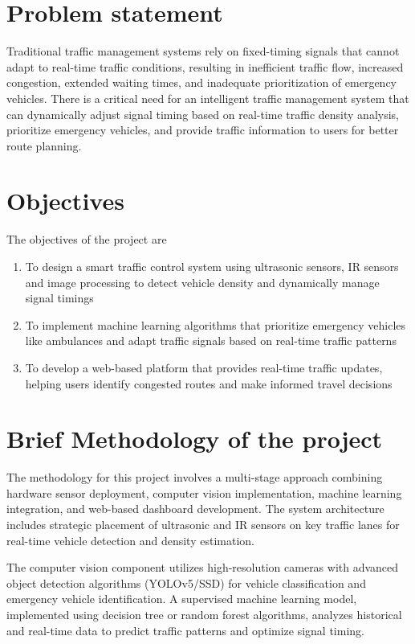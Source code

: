 \documentclass[12pt]{report}
\begin{document}
\section[Problem statement]{\textbf{Problem statement}}

Traditional traffic management systems rely on fixed-timing signals that cannot adapt to real-time traffic conditions, resulting in inefficient traffic flow, increased congestion, extended waiting times, and inadequate prioritization of emergency vehicles. There is a critical need for an intelligent traffic management system that can dynamically adjust signal timing based on real-time traffic density analysis, prioritize emergency vehicles, and provide traffic information to users for better route planning.

\section[Objectives]{\textbf{Objectives}}
The objectives of the project are
\begin{enumerate}
\item To design a smart traffic control system using ultrasonic sensors, IR sensors and image processing to detect vehicle density and dynamically manage signal timings
\item To implement machine learning algorithms that prioritize emergency vehicles like ambulances and adapt traffic signals based on real-time traffic patterns
\item To develop a web-based platform that provides real-time traffic updates, helping users identify congested routes and make informed travel decisions
\end{enumerate}

\section[Brief Methodology of the project]{\textbf{Brief Methodology of the project}}

The methodology for this project involves a multi-stage approach combining hardware sensor deployment, computer vision implementation, machine learning integration, and web-based dashboard development. The system architecture includes strategic placement of ultrasonic and IR sensors on key traffic lanes for real-time vehicle detection and density estimation.

The computer vision component utilizes high-resolution cameras with advanced object detection algorithms (YOLOv5/SSD) for vehicle classification and emergency vehicle identification. A supervised machine learning model, implemented using decision tree or random forest algorithms, analyzes historical and real-time data to predict traffic patterns and optimize signal timing.
\end{document}
